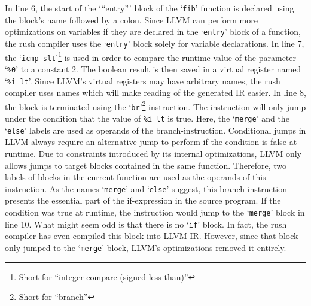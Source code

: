 In line 6, the start of the `\enquote{entry}' block of the `\texttt{fib}' function is declared using the block's name followed by a colon.
Since LLVM can perform more optimizations on variables if they are declared in the `\texttt{entry}' block of a function,
the rush compiler uses the `\texttt{entry}' block solely for variable declarations.
In line 7, the `\texttt{icmp slt}'\footnote{Short for \enquote{integer compare (signed less than)}} is used in order to compare the runtime value of the parameter `\texttt{\%0}' to a constant 2.
The boolean result is then saved in a virtual register named `\texttt{\%i\_lt}'.
Since LLVM's virtual registers may have arbitrary names,
the rush compiler uses names which will make reading of the generated IR easier.
In line 8, the block is terminated using the `\texttt{br}'\footnote{Short for \enquote{branch}} instruction.
The instruction will only jump under the condition that the value of \texttt{\%i\_lt} is true.
Here, the `\texttt{merge}' and the `\texttt{else}' labels are used as operands of the branch-instruction.
Conditional jumps in LLVM always require an alternative jump to perform if the condition is false at runtime.
Due to constraints introduced by its internal optimizations, LLVM only allows jumps to target blocks contained in the same function.
Therefore, two labels of blocks in the current function are used as the operands of this instruction.
As the names `\texttt{merge}' and `\texttt{else}' suggest, this branch-instruction presents the essential part of the if-expression in the source program.
If the condition was true at runtime, the instruction would jump to the `\texttt{merge}' block in line 10.
What might seem odd is that there is no `\texttt{if}' block.
In fact, the rush compiler has even compiled this block into LLVM IR\@.
However, since that block only jumped to the `\texttt{merge}' block, LLVM's optimizations removed it entirely.


